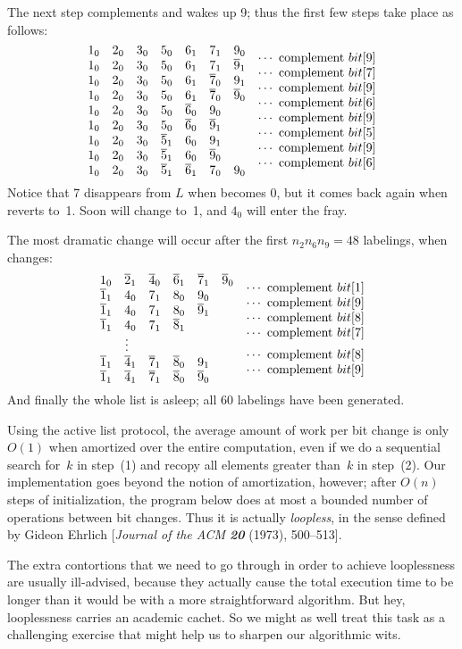 The next step complements  and wakes up 9; thus the first
few steps take place as follows:
$$\vbox{\halign{$#\hfil$&
\quad\smash{\lower.5\baselineskip\hbox{$\cdots$ complement $\bit#$\hfil}}\cr
1_0\quad 2_0\quad 3_0\quad 5_0\quad 6_1\quad 7_1\quad 9_0&9\cr
1_0\quad 2_0\quad 3_0\quad 5_0\quad 6_1\quad 7_1\quad \p9_1&7\cr
1_0\quad 2_0\quad 3_0\quad 5_0\quad 6_1\quad \p7_0\quad 9_1&9\cr
1_0\quad 2_0\quad 3_0\quad 5_0\quad 6_1\quad \p7_0\quad \p9_0&6\cr
1_0\quad 2_0\quad 3_0\quad 5_0\quad \p6_0\quad 9_0&9\cr
1_0\quad 2_0\quad 3_0\quad 5_0\quad \p6_0\quad \p9_1&5\cr
1_0\quad 2_0\quad 3_0\quad \p5_1\quad 6_0\quad 9_1&9\cr
1_0\quad 2_0\quad 3_0\quad \p5_1\quad 6_0\quad \p9_0&6\cr
1_0\quad 2_0\quad 3_0\quad \p5_1\quad \p6_1\quad 7_0\quad 9_0\cr}}$$
Notice that 7 disappears from $L$ when  becomes 0, but it
comes back again when  reverts to~1. Soon  will
change to~1, and $4_0$ will enter the fray.

The most dramatic change will occur after the first $n_2n_6n_9=48$ labelings,
when  changes:
$$\vbox{\halign{$#\hfil$&
\quad\smash{\lower.5\baselineskip\hbox{$\cdots$ complement $\bit#$\hfil}}\cr
1_0\quad \p2_1\quad \p4_0\quad \p6_1\quad \p7_1\quad \p9_0&1\cr
\p1_1\quad 4_0\quad 7_1\quad 8_0\quad 9_0&9\cr
\p1_1\quad 4_0\quad 7_1\quad 8_0\quad \p9_1&8\cr
\p1_1\quad 4_0\quad 7_1\quad \p8_1&7\cr
\qquad\vdots&8\cr
\p1_1\quad \p4_1\quad \p7_1\quad \p8_0\quad 9_1&9\cr
\p1_1\quad \p4_1\quad \p7_1\quad \p8_0\quad \p9_0\cr}}$$
And finally the whole list is asleep; all 60 labelings have been generated.

\fi

Using the active list protocol, the average amount of work per bit change
is
only $O(1)$ when amortized over the entire computation, even if we do a
sequential search for~$k$ in step~(1) and recopy all elements greater than~$k$
in step~(2). Our implementation goes beyond the notion of amortization,
however; after $O(n)$ steps of initialization, the program below does at most
a bounded number of operations between bit changes. Thus it is actually {\it
loopless}, in the sense defined by Gideon Ehrlich [{\sl Journal of the ACM\/
\bf20} (1973), 500--513].

The extra contortions that we need to go through in order to achieve
looplessness are usually ill-advised, because they actually cause the
total execution time to be longer than it would be with a more straightforward
algorithm. But hey, looplessness carries an academic cachet.
So we might as well treat this task as a
challenging exercise that might help us to sharpen our algorithmic wits.

